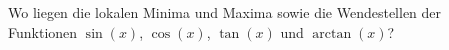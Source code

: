 \item Wo liegen die lokalen Minima und Maxima sowie die Wendestellen der Funktionen $\sin(x)$, $\cos(x)$,
$\tan(x)$ und $\arctan(x)$?
